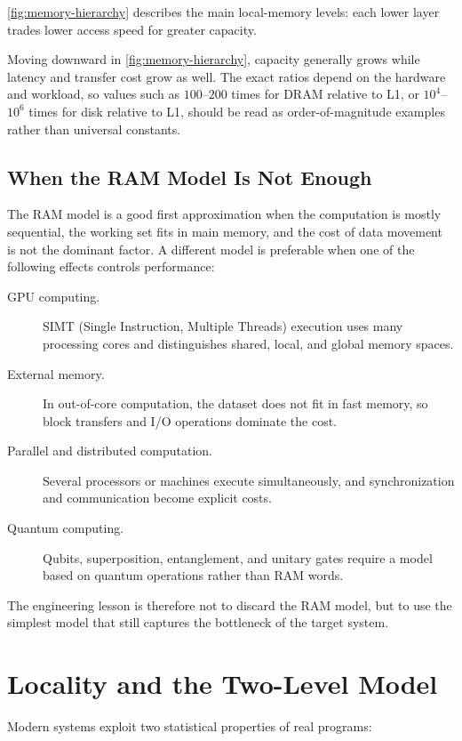 \autoref{fig:memory-hierarchy} describes the main local-memory levels:
each lower layer trades lower access speed for greater capacity.

Moving downward in \autoref{fig:memory-hierarchy}, capacity generally grows
while latency and transfer cost grow as well. The exact ratios depend on the
hardware and workload, so values such as $100$--$200$ times for DRAM relative
to L1, or $10^4$--$10^6$ times for disk relative to L1, should be read as
order-of-magnitude examples rather than universal constants.

\subsection{When the RAM Model Is Not Enough}

The RAM model is a good first approximation when the computation is mostly
sequential, the working set fits in main memory, and the cost of data movement
is not the dominant factor. A different model is preferable when one of the
following effects controls performance:

\begin{description}
  \item[GPU computing.] SIMT (Single Instruction, Multiple Threads) execution
    uses many processing cores and distinguishes shared, local, and global
    memory spaces.
  \item[External memory.] In out-of-core computation, the dataset does not
    fit in fast memory, so block transfers and I/O operations dominate the
    cost.
  \item[Parallel and distributed computation.] Several processors or machines
    execute simultaneously, and synchronization and communication become
    explicit costs.
  \item[Quantum computing.] Qubits, superposition, entanglement, and unitary
    gates require a model based on quantum operations rather than RAM words.
\end{description}

The engineering lesson is therefore not to discard the RAM model, but to use
the simplest model that still captures the bottleneck of the target system.

\section{Locality and the Two-Level Model}
\label{sec:external-memory}

Modern systems exploit two statistical properties of real programs:

